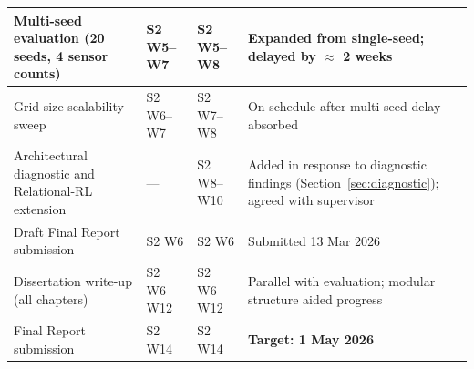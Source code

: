 \begin{table}[htbp]
\begin{tabularx}{\textwidth}{p{5.2cm} p{1.9cm} p{1.9cm} X}
\midrule
Multi-seed evaluation (20 seeds, 4 sensor counts) & S2 W5--W7 & S2 W5--W8 & Expanded from single-seed; delayed by $\approx$ 2 weeks \\
\midrule
Grid-size scalability sweep & S2 W6--W7 & S2 W7--W8 & On schedule after multi-seed delay absorbed \\
\midrule
Architectural diagnostic and Relational-RL extension & --- & S2 W8--W10 & Added in response to diagnostic findings (Section~\ref{sec:diagnostic}); agreed with supervisor \\
\midrule
Draft Final Report submission & S2 W6 & S2 W6 & Submitted 13 Mar 2026 \\
\midrule
Dissertation write-up (all chapters) & S2 W6--W12 & S2 W6--W12 & Parallel with evaluation; modular structure aided progress \\
\midrule
Final Report submission & S2 W14 & S2 W14 & \textbf{Target: 1 May 2026} \\
\bottomrule
\end{tabularx}
\end{table}
